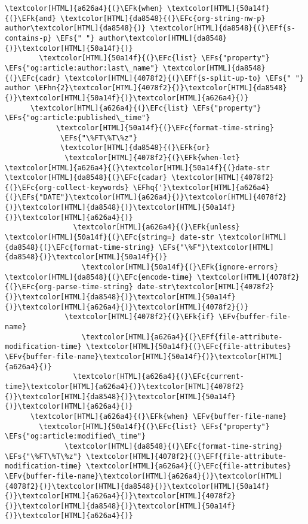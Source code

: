 \documentclass{scrartcl}
\newcommand{\EFk}[1]{\textcolor{EFk}{#1}} %
\newcommand{\EFs}[1]{\textcolor{EFs}{#1}} %
\newcommand{\EFc}[1]{\textcolor{EFc}{#1}} %
\newcommand{\EFv}[1]{\textcolor{EFv}{#1}} %
\newcommand{\EFf}[1]{\textcolor{EFf}{#1}} %
\newcommand{\EFhn}[1]{\textcolor{EFhn}{\textbf{#1}}} %
\newcommand{\EFhq}[1]{\textcolor{EFhq}{#1}} %
\begin{document}
\begin{Code}
\begin{Verbatim}[]
      \textcolor[HTML]{a626a4}{(}\EFk{when} \textcolor[HTML]{50a14f}{(}\EFk{and} \textcolor[HTML]{da8548}{(}\EFc{org-string-nw-p} author\textcolor[HTML]{da8548}{)} \textcolor[HTML]{da8548}{(}\EFf{s-contains-p} \EFs{" "} author\textcolor[HTML]{da8548}{)}\textcolor[HTML]{50a14f}{)}
        \textcolor[HTML]{50a14f}{(}\EFc{list} \EFs{"property"} \EFs{"og:article:author:last\_name"} \textcolor[HTML]{da8548}{(}\EFc{cadr} \textcolor[HTML]{4078f2}{(}\EFf{s-split-up-to} \EFs{" "} author \EFhn{2}\textcolor[HTML]{4078f2}{)}\textcolor[HTML]{da8548}{)}\textcolor[HTML]{50a14f}{)}\textcolor[HTML]{a626a4}{)}
      \textcolor[HTML]{a626a4}{(}\EFc{list} \EFs{"property"} \EFs{"og:article:published\_time"}
            \textcolor[HTML]{50a14f}{(}\EFc{format-time-string}
             \EFs{"\%FT\%T\%z"}
             \textcolor[HTML]{da8548}{(}\EFk{or}
              \textcolor[HTML]{4078f2}{(}\EFk{when-let} \textcolor[HTML]{a626a4}{(}\textcolor[HTML]{50a14f}{(}date-str \textcolor[HTML]{da8548}{(}\EFc{cadar} \textcolor[HTML]{4078f2}{(}\EFc{org-collect-keywords} \EFhq{'}\textcolor[HTML]{a626a4}{(}\EFs{"DATE"}\textcolor[HTML]{a626a4}{)}\textcolor[HTML]{4078f2}{)}\textcolor[HTML]{da8548}{)}\textcolor[HTML]{50a14f}{)}\textcolor[HTML]{a626a4}{)}
                \textcolor[HTML]{a626a4}{(}\EFk{unless} \textcolor[HTML]{50a14f}{(}\EFc{string=} date-str \textcolor[HTML]{da8548}{(}\EFc{format-time-string} \EFs{"\%F"}\textcolor[HTML]{da8548}{)}\textcolor[HTML]{50a14f}{)}
                  \textcolor[HTML]{50a14f}{(}\EFk{ignore-errors} \textcolor[HTML]{da8548}{(}\EFc{encode-time} \textcolor[HTML]{4078f2}{(}\EFc{org-parse-time-string} date-str\textcolor[HTML]{4078f2}{)}\textcolor[HTML]{da8548}{)}\textcolor[HTML]{50a14f}{)}\textcolor[HTML]{a626a4}{)}\textcolor[HTML]{4078f2}{)}
              \textcolor[HTML]{4078f2}{(}\EFk{if} \EFv{buffer-file-name}
                  \textcolor[HTML]{a626a4}{(}\EFf{file-attribute-modification-time} \textcolor[HTML]{50a14f}{(}\EFc{file-attributes} \EFv{buffer-file-name}\textcolor[HTML]{50a14f}{)}\textcolor[HTML]{a626a4}{)}
                \textcolor[HTML]{a626a4}{(}\EFc{current-time}\textcolor[HTML]{a626a4}{)}\textcolor[HTML]{4078f2}{)}\textcolor[HTML]{da8548}{)}\textcolor[HTML]{50a14f}{)}\textcolor[HTML]{a626a4}{)}
      \textcolor[HTML]{a626a4}{(}\EFk{when} \EFv{buffer-file-name}
        \textcolor[HTML]{50a14f}{(}\EFc{list} \EFs{"property"} \EFs{"og:article:modified\_time"}
              \textcolor[HTML]{da8548}{(}\EFc{format-time-string} \EFs{"\%FT\%T\%z"} \textcolor[HTML]{4078f2}{(}\EFf{file-attribute-modification-time} \textcolor[HTML]{a626a4}{(}\EFc{file-attributes} \EFv{buffer-file-name}\textcolor[HTML]{a626a4}{)}\textcolor[HTML]{4078f2}{)}\textcolor[HTML]{da8548}{)}\textcolor[HTML]{50a14f}{)}\textcolor[HTML]{a626a4}{)}\textcolor[HTML]{4078f2}{)}\textcolor[HTML]{da8548}{)}\textcolor[HTML]{50a14f}{)}\textcolor[HTML]{a626a4}{)}


\end{Verbatim}
\end{Code}
\end{document}
